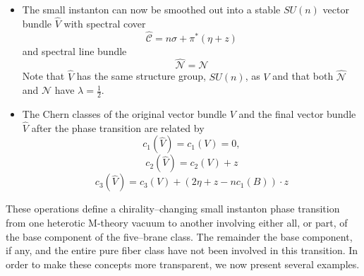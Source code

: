 \documentclass[a4paper,12pt]{article}
\numberwithin{equation}{section}
\def\cC{{\mathcal C}}
\def\cN{{\mathcal N}}
\theoremstyle{plain}
\begin{document}
\begin{itemize}
\item The small instanton can now be smoothed out into a stable $SU(n)$
vector bundle $\widehat{V}$ with spectral cover
\begin{equation}
\widehat{\cC}= n\sigma+ \pi^{*}(\eta+z)
\label{eq:98}
\end{equation}
and spectral line bundle
\begin{equation}
\widehat{\cN}=\cN
\label{eq:99}
\end{equation}
Note that $\widehat{V}$ has the same structure group, $SU(n)$, as $V$ and that both
$\widehat{\cN}$ and $\cN$ have $\lambda=\frac{1}{2}$.

\item The Chern classes of the original vector bundle $V$ and the final 
vector bundle $\widehat{V}$ after the phase transition are related by
\begin{equation}
c_{1}(\widehat{V})=c_{1}(V)=0,
\label{eq:100}
\end{equation}
\begin{equation}
c_{2}(\widehat{V})=c_{2}(V) +z
\label{eq:101}
\end{equation}
\begin{equation}
c_{3}(\widehat{V})=c_{3}(V)+ (2\eta+z-nc_{1}(B))\cdot z
\label{eq:102}
\end{equation}

\end{itemize}

These operations define a chirality--changing small instanton phase transition
from one heterotic M-theory vacuum to another involving either all, or part, of
the base component of the five--brane class. The remainder the base
component, if any, and the entire pure fiber class have not been involved in
this transition. In order to make these concepts more transparent, we now
present several examples.

\bigskip
\end{document}
